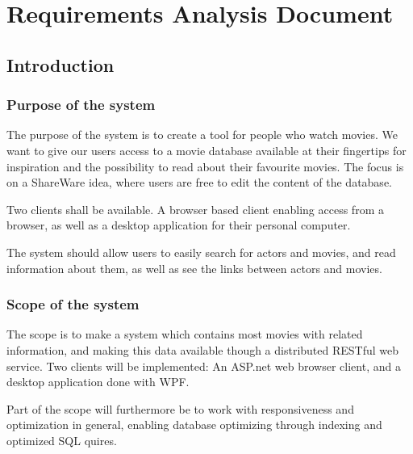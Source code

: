 \chapter{Requirements Analysis Document}
\label{chap:RAD}

\section{Introduction}
\label{sec:introduction}



\subsection{Purpose of the system}

The purpose of the system is to create a tool for people who watch movies. We want to give our users access to a movie database available at their fingertips for inspiration and the possibility to read about their favourite movies. The focus is on a ShareWare idea, where users are free to edit the content of the database.

Two clients shall be available. A browser based client enabling access from a browser, as well as a desktop application for their personal computer.  

The system should allow users to easily search for actors and movies, and read information about them, as well as see the links between actors and movies.




\subsection{Scope of the system}

The scope is to make a system which contains most movies with related information, and making this data available though a distributed RESTful web service. Two clients will be implemented: An ASP.net web browser client, and a desktop application done with WPF.

Part of the scope will furthermore be to work with responsiveness and optimization in general, enabling database optimizing through indexing and optimized SQL quires.


